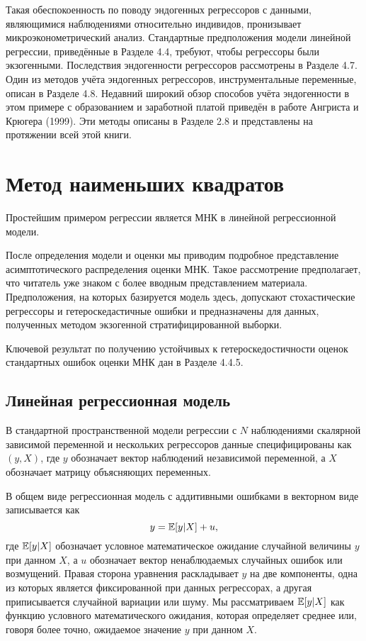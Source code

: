 Такая обеспокоенность по поводу эндогенных регрессоров с данными, являющимися наблюдениями относительно индивидов, пронизывает микроэконометрический анализ. Стандартные предположения модели линейной регрессии, приведённые в Разделе 4.4, требуют, чтобы регрессоры были экзогенными. Последствия эндогенности регрессоров рассмотрены в Разделе 4.7. Один из методов учёта эндогенных регрессоров, инструментальные переменные, описан в Разделе 4.8. Недавний широкий обзор способов учёта эндогенности в этом примере с образованием и заработной платой приведён в работе Ангриста и Крюгера (1999). Эти методы описаны в Разделе 2.8 и представлены на протяжении всей этой книги.


\section{Метод наименьших квадратов}

Простейшим примером регрессии является МНК в линейной регрессионной модели.

После определения модели и оценки мы приводим подробное представление асимптотического распределения оценки МНК. Такое рассмотрение предполагает, что читатель уже знаком с более вводным представлением материала. Предположения, на которых базируется модель здесь, допускают стохастические регрессоры и гетероскедастичные ошибки и предназначены для данных, полученных методом экзогенной стратифицированной выборки. 

Ключевой результат по получению устойчивых к гетероскедостичности оценок стандартных ошибок оценки МНК дан в Разделе 4.4.5.

\subsection{Линейная регрессионная модель}

В стандартной пространственной модели регрессии с $N$ наблюдениями скалярной зависимой переменной и нескольких регрессоров данные специфицированы как $(y,X)$, где $y$ обозначает вектор наблюдений независимой переменной, а $X$ обозначает матрицу объясняющих переменных.

В общем виде регрессионная модель с аддитивными ошибками в векторном виде записывается как 
\begin{equation}
y = \mathbb{E}{[y|X]}+u,
\end{equation}
где $\mathbb{E}{[y|X]}$ обозначает условное математическое ожидание случайной величины $y$ при данном $X$, а $u$ обозначает вектор ненаблюдаемых случайных ошибок или возмущений. Правая сторона уравнения раскладывает $y$ на две компоненты, одна из которых является фиксированной при данных регрессорах, а другая приписывается случайной вариации или шуму. Мы рассматриваем $\mathbb{E}{[y|X]}$ как функцию условного математического ожидания, которая определяет среднее или, говоря более точно, ожидаемое значение $y$ при данном $X$. 

